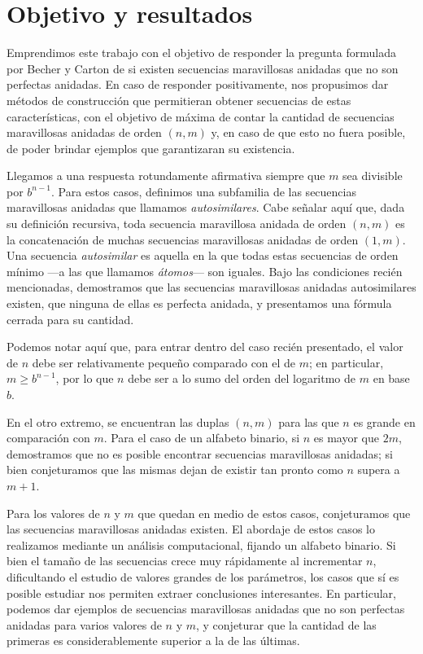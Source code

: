 \section{Objetivo y resultados}
Emprendimos este trabajo con el objetivo de responder la pregunta formulada por
Becher y Carton de si existen secuencias maravillosas anidadas que no son
perfectas anidadas.
En caso de responder positivamente, nos propusimos dar métodos de construcción
que permitieran obtener secuencias de estas características, con el objetivo
de máxima de contar la cantidad de secuencias maravillosas anidadas de orden
$(n,m)$ y, en caso de que esto no fuera posible, de poder brindar ejemplos que
garantizaran su existencia.

Llegamos a una respuesta rotundamente afirmativa siempre que $m$ sea
divisible por $b^{n-1}$. Para estos casos, definimos una subfamilia de las
secuencias maravillosas anidadas que llamamos \emph{autosimilares}. Cabe señalar
aquí que, dada su definición recursiva, toda secuencia maravillosa anidada
de orden $(n,m)$ es la concatenación de muchas secuencias maravillosas anidadas
de orden $(1,m)$. Una secuencia \emph{autosimilar} es aquella en la que todas
estas secuencias de orden mínimo ---a las que llamamos \emph{átomos}---
son iguales. Bajo las condiciones recién
mencionadas, demostramos que las secuencias maravillosas anidadas autosimilares
existen, que ninguna de ellas es perfecta anidada, y presentamos una fórmula
cerrada para su cantidad.

Podemos notar aquí que, para entrar dentro del caso recién presentado,
el valor de $n$ debe ser relativamente pequeño comparado con el de $m$;
en particular, $m \geq b^{n-1}$, por lo que $n$ debe ser a lo sumo del orden
del logaritmo de $m$ en base $b$.

En el otro extremo, se encuentran las duplas $(n,m)$ para las que $n$ es grande
en comparación con $m$. Para el caso de un alfabeto binario,
si $n$ es mayor que $2m$, demostramos que no es
posible encontrar secuencias maravillosas anidadas; si bien conjeturamos que
las mismas dejan de existir tan pronto como $n$ supera a $m + 1$.

Para los valores de $n$ y $m$ que quedan en medio de estos casos,
conjeturamos que las secuencias maravillosas anidadas existen. El abordaje de
estos casos lo realizamos mediante un análisis computacional, fijando un
alfabeto binario. Si bien el tamaño de las secuencias crece muy rápidamente al
incrementar $n$, dificultando el estudio de valores grandes de los parámetros,
los casos que sí es posible estudiar nos permiten extraer conclusiones
interesantes. En particular, podemos dar ejemplos de secuencias maravillosas
anidadas que no son perfectas anidadas para varios valores de $n$ y $m$, y
conjeturar que la cantidad de las primeras es considerablemente superior a la
de las últimas.

